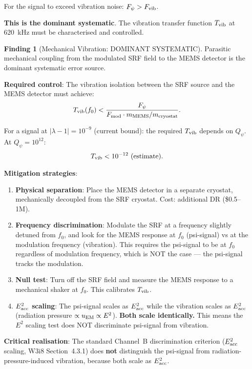 \documentclass[11pt]{article}
\newcommand{\lam}{\lambda}
\newcommand{\Qpsi}{Q_\psi}
\newcommand{\lbone}{|\lam - 1|}
\theoremstyle{definition}
\newtheorem{finding}[theorem]{Finding}
\theoremstyle{remark}
\begin{document}
For the signal to exceed vibration noise:
$F_\psi > F_{\rm vib}$.

\textbf{This is the dominant systematic}. The vibration transfer
function $T_{\rm vib}$ at 620~kHz must be characterised and controlled.

\begin{finding}[Mechanical Vibration: DOMINANT SYSTEMATIC]
\label{find:vibration}
Parasitic mechanical coupling from the modulated SRF field to the
MEMS detector is the dominant systematic error source.

\textbf{Required control}: The vibration isolation between the SRF
source and the MEMS detector must achieve:
\begin{equation}
T_{\rm vib}(f_0) < \frac{F_\psi}{F_{\rm mod}\cdot
m_{\rm MEMS}/m_{\rm cryostat}}.
\end{equation}

For a signal at $\lbone = 10^{-9}$ (current bound): the required
$T_{\rm vib}$ depends on $\Qpsi$. At $\Qpsi = 10^{12}$:
\begin{equation}
T_{\rm vib} < 10^{-12}~\text{(estimate)}.
\end{equation}

\textbf{Mitigation strategies}:
\begin{enumerate}[nosep]
\item \textbf{Physical separation}: Place the MEMS detector in a
  separate cryostat, mechanically decoupled from the SRF cryostat.
  Cost: additional DR (\$0.5--1M).
\item \textbf{Frequency discrimination}: Modulate the SRF at a
  frequency slightly detuned from $f_0$, and look for the MEMS
  response at $f_0$ (psi-signal) vs at the modulation frequency
  (vibration). This requires the psi-signal to be at $f_0$
  regardless of modulation frequency, which is NOT the case ---
  the psi-signal tracks the modulation.
\item \textbf{Null test}: Turn off the SRF field and measure the
  MEMS response to a mechanical shaker at $f_0$. This calibrates
  $T_{\rm vib}$.
\item \textbf{$E_{\rm acc}^2$ scaling}: The psi-signal scales as
  $E_{\rm acc}^2$ while the vibration scales as $E_{\rm acc}^2$
  (radiation pressure $\propto u_{\rm EM} \propto E^2$).
  \textbf{Both scale identically.} This means the $E^2$ scaling
  test does NOT discriminate psi-signal from vibration.
\end{enumerate}

\textbf{Critical realisation}: The standard Channel~B discrimination
criterion ($E_{\rm acc}^2$ scaling, W3i8 Section~4.3.1) does
\textbf{not} distinguish the psi-signal from radiation-pressure-induced
vibration, because both scale as $E_{\rm acc}^2$.


\end{finding}
\end{document}
